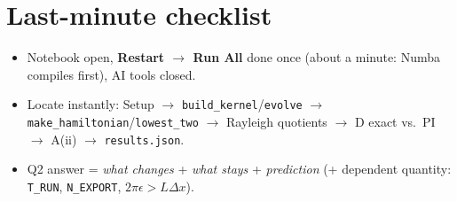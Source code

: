 \documentclass[10pt]{article}
\newcommand{\code}[1]{\texttt{#1}}
\begin{document}
\section{Last-minute checklist}
\begin{itemize}
\item Notebook open, \textbf{Restart $\to$ Run All} done once (about a minute: Numba compiles first), AI tools closed.
\item Locate instantly: Setup $\to$ \code{build\_kernel}/\code{evolve} $\to$ \code{make\_hamiltonian}/\code{lowest\_two} $\to$ Rayleigh quotients $\to$ D exact vs.\ PI $\to$ A(ii) $\to$ \code{results.json}.
\item Q2 answer = \emph{what changes} + \emph{what stays} + \emph{prediction} (+ dependent quantity: \code{T\_RUN}, \code{N\_EXPORT}, $2\pi\epsilon>L\Delta x$).
\end{itemize}
\end{document}
